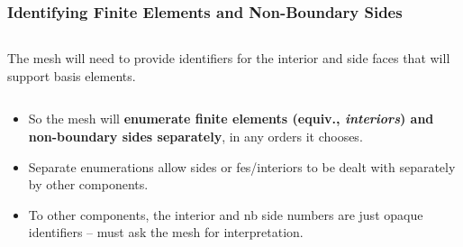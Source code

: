 \documentclass[compress]{beamer}
\begin{document}
\begin{frame}
  \frametitle{Identifying Finite Elements and Non-Boundary Sides}
  \begin{columns}
    The mesh will need to provide identifiers for the interior and side faces that will support basis elements.
       {}
               {}
  \end{columns}
  \pause
  \begin{itemize}[<+->]
    \item So the mesh will \textbf{enumerate finite elements (equiv., \emph{interiors}) and non-boundary sides separately}, in any orders it chooses.
    \item Separate enumerations allow sides or fes/interiors to be dealt with separately by other components.
    \item To other components, the interior and nb side numbers are just opaque identifiers -- must ask the mesh for interpretation.
  \end{itemize}
\end{frame}
 
\end{document}
